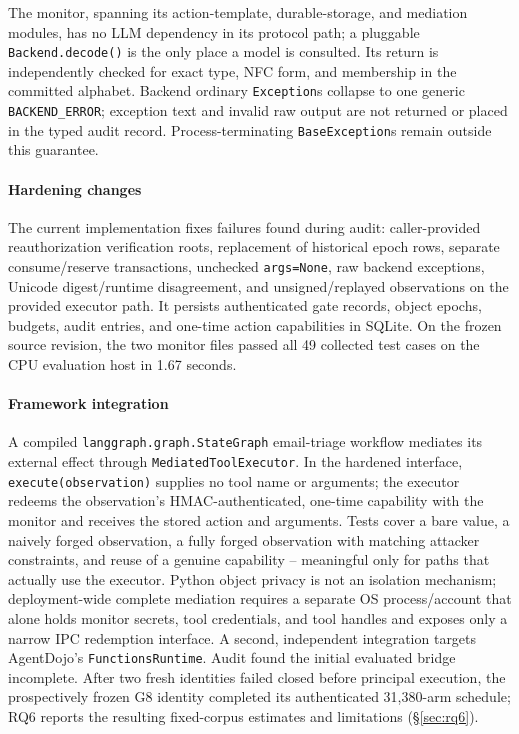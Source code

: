 \documentclass[conference,compsoc]{IEEEtran}
\begin{document}
The monitor, spanning its action-template, durable-storage, and mediation
modules, has no LLM
dependency in its protocol path; a pluggable \texttt{Backend.decode()} is the
only place a model is consulted. Its return is independently checked for
exact type, NFC form, and membership in the committed alphabet. Backend
ordinary \texttt{Exception}s collapse to one generic
\texttt{BACKEND\_ERROR}; exception text and invalid raw output are not
returned or placed in the typed audit record. Process-terminating
\texttt{BaseException}s remain outside this guarantee.

\paragraph{Hardening changes} The current implementation fixes failures
found during audit: caller-provided reauthorization verification roots,
replacement of historical epoch rows, separate consume/reserve transactions,
unchecked \texttt{args=None}, raw backend exceptions, Unicode digest/runtime
disagreement, and unsigned/replayed observations on the provided executor
path. It persists authenticated
gate records, object epochs, budgets, audit entries, and one-time action
capabilities in SQLite. On the frozen source revision, the two monitor files
passed all 49 collected test cases on the CPU evaluation host in 1.67 seconds.

\paragraph{Framework integration} A compiled
\texttt{langgraph.graph.StateGraph} email-triage workflow mediates its
external effect through \texttt{MediatedToolExecutor}. In the hardened
interface, \texttt{execute(observation)} supplies no tool name or
arguments; the executor redeems the observation's HMAC-authenticated,
one-time capability with the monitor and receives the stored action and
arguments. Tests cover a bare value, a naively forged observation, a
fully forged observation with matching attacker constraints, and reuse
of a genuine capability -- meaningful only for paths that actually use
the executor. Python object privacy is not an isolation mechanism;
deployment-wide complete mediation requires a separate OS process/account
that alone holds monitor secrets, tool credentials, and tool handles and
exposes only a narrow IPC redemption interface. A second, independent
integration targets AgentDojo's \texttt{FunctionsRuntime}. Audit found the
initial evaluated bridge incomplete. After two fresh identities failed closed
before principal execution, the prospectively frozen G8 identity completed its
authenticated 31{,}380-arm schedule; RQ6 reports the resulting fixed-corpus
estimates and limitations (\S\ref{sec:rq6}).
\end{document}
